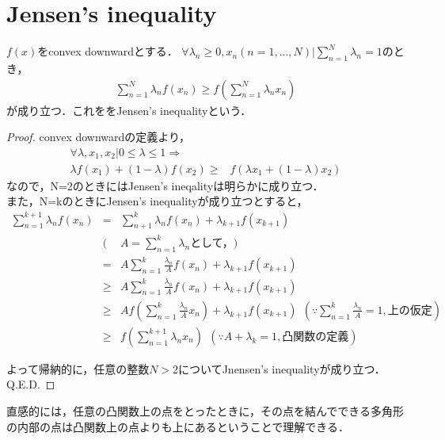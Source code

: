 %
%

\section{Jensen's inequality}
\label{sec:label}

$f(x)$をconvex downwardとする． $\forall \lambda_n \geq 0, x_n(n=1,...,N) | \sum^N_{n = 1}\lambda_n = 1$のとき，
\begin{eqnarray}
  \sum^N_{n=1}\lambda_nf(x_n) \geq f(\sum^N_{n=1}\lambda_n x_n)
\end{eqnarray}
が成り立つ．これををJensen's inequalityという．

\begin{proof}
  convex downwardの定義より，
\begin{eqnarray}
\forall \lambda, x_1, x_2 | 0 \leq \lambda \leq 1 \Rightarrow&
 \nonumber \\ 
\lambda f(x_1) + (1-\lambda) f(x_2) \geq& f(\lambda x_1 + (1-\lambda) x_2)
\end{eqnarray}
なので，N=2のときにはJensen's ineqalityは明らかに成り立つ．\\
また，N=kのときにJensen's inequalityが成り立つとすると，
\begin{eqnarray}
  \sum^{k+1}_{n=1} \lambda_n f(x_n) 
&=& \sum^k_{n+1} \lambda_nf(x_n) + \lambda_{k+1} f(x_{k+1}) \nonumber \\ 
&(&A = \sum^k_{n=1} \lambda_n \mbox{として，}) \nonumber \\
&=& A \sum^k_{n=1} \frac{\lambda_n}{A} f(x_n)+ \lambda_{k+1} f(x_{k+1}) \nonumber \\ 
&\geq& A \sum^k_{n=1} \frac{\lambda_n}{A} f(x_n)+ \lambda_{k+1} f(x_{k+1}) \nonumber \\
&\geq& A f(\sum^k_{n=1} \frac{\lambda_n}{A} x_n) + \lambda_{k+1} f(x_{k+1}) \ \ (\because \sum_{n=1}^k \frac{\lambda_n}{A} = 1,
\mbox{上の仮定}) \nonumber \\
&\geq& f(\sum^{k+1}_{n=1} \lambda_n x_n ) \ \ (\because A+\lambda_k = 1, \mbox{凸関数の定義})
\end{eqnarray}

よって帰納的に，任意の整数$N>2$についてJnensen's inequalityが成り立つ．Q.E.D.

\end{proof}

直感的には，任意の凸関数上の点をとったときに，その点を結んでできる多角形の内部の点は凸関数上の点よりも上にあるということで理解できる．
